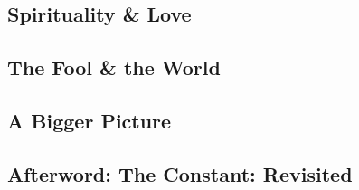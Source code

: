 \documentclass{article}
\numberwithin{equation}{section}
\begin{document}
\subsection{Spirituality \& Love}

\subsection{The Fool \& the World}

\subsection{A Bigger Picture}

\subsection{Afterword: The Constant: Revisited}


\printbibliography[heading=bibintoc]
	
\end{document}
